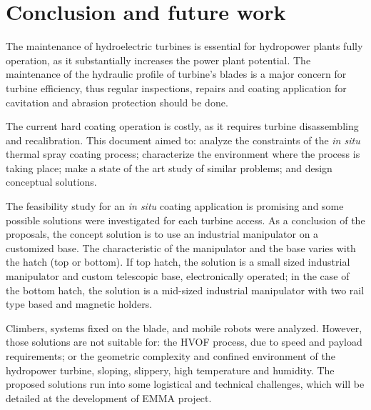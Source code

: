 \section{Conclusion and future work}\label{sec:conclusions}
The maintenance of hydroelectric turbines is essential for hydropower plants
fully operation, as it substantially increases the power plant potential. The
maintenance of the hydraulic profile of turbine's blades is a major concern for
turbine efficiency, thus regular inspections, repairs and coating application
for cavitation and abrasion protection should be done.

The current hard coating operation is costly, as it requires turbine
disassembling and recalibration. This document aimed to: analyze the
constraints of the \textit{in situ} thermal spray coating process; characterize the environment
where the process is taking place; make a state of the art study
of similar problems; and design conceptual solutions.


The feasibility study for an \textit{in situ} coating application is promising
and some possible solutions were investigated for each turbine access. As a
conclusion of the proposals, the concept solution is to use an industrial
manipulator on a customized base. The characteristic of the manipulator and the
base varies with the hatch (top or bottom). If top hatch, the solution is a
small sized industrial manipulator and custom telescopic base, electronically
operated; in the case of the bottom hatch, the solution is a mid-sized
industrial manipulator with two rail type based and magnetic holders.

Climbers, systems fixed on the blade, and mobile robots were analyzed.
However, those solutions are not suitable for: the HVOF process, due to speed
and payload requirements; or the geometric complexity and
confined environment of the hydropower turbine, sloping, slippery, high
temperature and humidity. The proposed solutions run into some logistical and
technical challenges, which will be detailed at the development of EMMA project.

